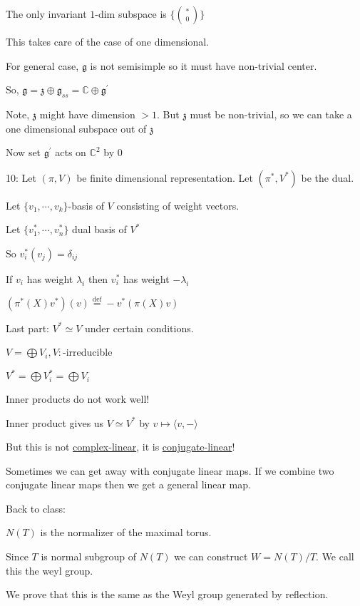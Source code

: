 \documentclass{article}
\theoremstyle{definition}
\begin{document}
The only invariant \(1\)-dim subspace is \(\{ \binom{\ast}{0} \} \) 

This takes care of the case of one dimensional.

For general case, \(\mathfrak{g}\) is not semisimple so it must have non-trivial center.

So, \(\mathfrak{g} = \mathfrak{z} \oplus \mathfrak{g}_{s s} = \mathbb{C} \oplus \mathfrak{g}^{\prime}\) 

Note, \(\mathfrak{z}\) might have dimension \(> 1\). But \(\mathfrak{z}\) must be non-trivial, so we can take a one dimensional subspace out of \(\mathfrak{z}\)  

Now set \(\mathfrak{g}^{\prime}\) acts on \(\mathbb{C}^2\) by \(0\) 

10: Let \((\pi, V)\) be finite dimensional representation. Let \((\pi^{\ast} , V^{\ast} )\) be the dual.

Let \(\{ v_1,\cdots,v_k \} \)-basis of \(V\) consisting of weight vectors.

Let \(\{ v_1^{\ast} ,\cdots,v_n^{\ast} \} \) dual basis of \(V^{\ast}\) 

So \(v_i^{\ast} (v_j)=\delta_{ij}\)

If \(v_i\) has weight \(\lambda_i\) then \(v_i ^{\ast}\) has weight \(- \lambda_i\)

\((\pi^{\ast}(X)v^{\ast})(v)\overset{\operatorname{def}}{=} - v^{\ast}(\pi(X)v)\) 

Last part: \(V^{\ast} \simeq V\) under certain conditions.

\(V = \bigoplus V_i, V:\)-irreducible

\(V^{\ast} = \bigoplus V_i ^{\ast} = \bigoplus V_i\)

Inner products do not work well!

Inner product gives us \(V \simeq V^{\ast}\) by \(v \mapsto \langle v, - \rangle \) 

But this is not \underline{complex-linear}, it is \underline{conjugate-linear}!

Sometimes we can get away with conjugate linear maps. If we combine two conjugate linear maps then we get a general linear map.

Back to class:

\(N(T)\) is the normalizer of the maximal torus.

Since \(T\) is normal subgroup of \(N(T)\) we can construct \(W = N(T) / T\). We call this the weyl group.

We prove that this is the same as the Weyl group generated by reflection.
\end{document}

